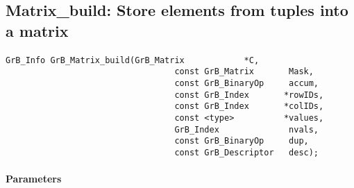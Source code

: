 \subsection{{\sf Matrix\_build}: Store elements from tuples into a matrix}
\label{Sec:Matrix_build}

\paragraph{\syntax}

\begin{Verbatim}[samepage=true]    
        GrB_Info GrB_Matrix_build(GrB_Matrix            *C,
                                  const GrB_Matrix       Mask,
                                  const GrB_BinaryOp     accum,
                                  const GrB_Index       *rowIDs,
                                  const GrB_Index       *colIDs, 
                                  const <type>          *values,
                                  GrB_Index              nvals,
                                  const GrB_BinaryOp     dup,
                                  const GrB_Descriptor   desc);
\end{Verbatim}

\paragraph{Parameters}

